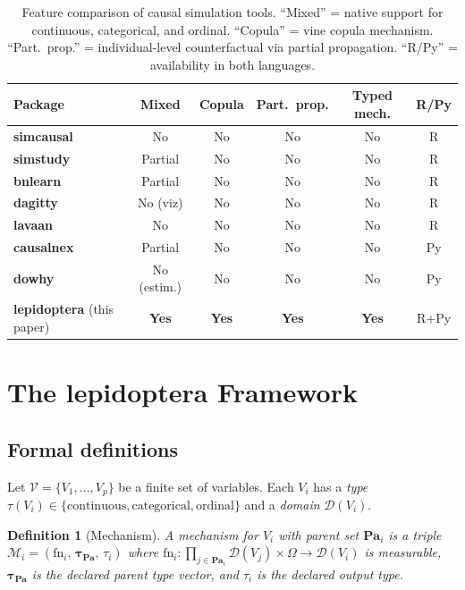 \documentclass[12pt,a4paper]{article}
\newcommand{\pkg}[1]{\textbf{#1}}
\newtheorem{definition}{Definition}
\begin{document}
\begin{table}[ht]
\centering
\caption{Feature comparison of causal simulation tools. ``Mixed'' = native support for continuous, categorical, and ordinal. ``Copula'' = vine copula mechanism. ``Part.\ prop.'' = individual-level counterfactual via partial propagation. ``R/Py'' = availability in both languages.}
\label{tab:comparison}
\small
\begin{tabular}{lccccc}
\toprule
Package & Mixed & Copula & Part.\ prop. & Typed mech. & R/Py \\
\midrule
\pkg{simcausal} \citep{sofrygin2017simcausal}   & No  & No  & No  & No  & R \\
\pkg{simstudy}  \citep{goldfeld2020simstudy}    & Partial & No & No & No & R \\
\pkg{bnlearn}   \citep{scutari2010bnlearn}       & Partial & No & No & No & R \\
\pkg{dagitty}   \citep{textor2016dagitty}        & No (viz) & No & No & No & R \\
\pkg{lavaan}    \citep{rosseel2012lavaan}         & No  & No  & No  & No  & R \\
\pkg{causalnex} \citep{beaumont2021causalnex}   & Partial & No & No & No & Py \\
\pkg{dowhy}     \citep{sharma2020dowhy}          & No (estim.) & No & No & No & Py \\
\pkg{lepidoptera} (this paper)                  & \textbf{Yes} & \textbf{Yes} & \textbf{Yes} & \textbf{Yes} & R+Py \\
\bottomrule
\end{tabular}
\end{table}

\section{The \pkg{lepidoptera} Framework}
\label{sec:framework}

\subsection{Formal definitions}

Let $\mathcal{V} = \{V_1, \ldots, V_p\}$ be a finite set of variables. Each $V_i$ has a \emph{type} $\tau(V_i) \in \{\text{continuous}, \text{categorical}, \text{ordinal}\}$ and a \emph{domain} $\mathcal{D}(V_i)$.

\begin{definition}[Mechanism]
A \emph{mechanism} for $V_i$ with parent set $\mathbf{Pa}_i$ is a triple $\mathcal{M}_i = (\mathrm{fn}_i,\, \boldsymbol{\tau}_{\mathbf{Pa}},\, \tau_i)$ where $\mathrm{fn}_i\colon \prod_{j\in\mathbf{Pa}_i}\mathcal{D}(V_j)\times\Omega \to \mathcal{D}(V_i)$ is measurable, $\boldsymbol{\tau}_{\mathbf{Pa}}$ is the declared parent type vector, and $\tau_i$ is the declared output type.
\end{definition}
\end{document}
